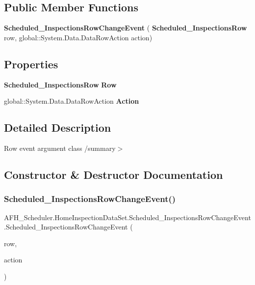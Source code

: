 \subsection*{Public Member Functions}
\begin{DoxyCompactItemize}
\item 
\textbf{ Scheduled\+\_\+\+Inspections\+Row\+Change\+Event} (\textbf{ Scheduled\+\_\+\+Inspections\+Row} row, global\+::\+System.\+Data.\+Data\+Row\+Action action)
\end{DoxyCompactItemize}
\subsection*{Properties}
\begin{DoxyCompactItemize}
\item 
\textbf{ Scheduled\+\_\+\+Inspections\+Row} \textbf{ Row}\hspace{0.3cm}{\ttfamily  [get]}
\item 
global\+::\+System.\+Data.\+Data\+Row\+Action \textbf{ Action}\hspace{0.3cm}{\ttfamily  [get]}
\end{DoxyCompactItemize}


\subsection{Detailed Description}
Row event argument class /summary$>$ 

\subsection{Constructor \& Destructor Documentation}
\mbox{\label{class_a_f_h___scheduler_1_1_home_inspection_data_set_1_1_scheduled___inspections_row_change_event_a17ad9626ff6c14e183673ff541661fed}} 
\subsubsection{Scheduled\_InspectionsRowChangeEvent()}
{\footnotesize\ttfamily A\+F\+H\+\_\+\+Scheduler.\+Home\+Inspection\+Data\+Set.\+Scheduled\+\_\+\+Inspections\+Row\+Change\+Event.\+Scheduled\+\_\+\+Inspections\+Row\+Change\+Event (\begin{DoxyParamCaption}\item[{\textbf{ Scheduled\+\_\+\+Inspections\+Row}}]{row,  }\item[{global\+::\+System.\+Data.\+Data\+Row\+Action}]{action }\end{DoxyParamCaption})}



